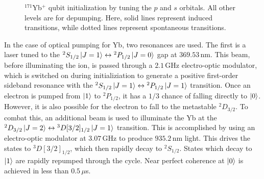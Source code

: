 \documentclass[12pt,a4paper]{amsart}
\numberwithin{equation}{section}
\theoremstyle{plain}
\theoremstyle{definition}
\begin{document}
\begin{figure}
{}
    \caption{${}^{171}$Yb$^+$ qubit initialization by tuning the $p$ and $s$ orbitals. All other levels are for depumping. Here, solid lines represent induced transitions, while dotted lines represent spontaneous transitions. \cite{rareEartQubi}}
    \label{fig:rareEartQubi3}
\end{figure}


In the case of optical pumping for Yb, two resonances are used.
The first is a laser tuned to the ${}^2S_{1/2}\ket{J=1} \leftrightarrow {}^2P_{1/2}\ket{J=0}$ gap at $369.53\,$nm. This beam, before illuminating the ion, is passed through a $2.1\,$GHz electro-optic modulator, which is switched on during initializiation to generate a positive first-order sideband resonance with the ${}^2S_{1/2}\ket{J=1}\leftrightarrow {}^2P_{1/2}\ket{J=1}$ transition. Once an electron is pumped from $\ket{1}$ to ${}^2P_{1/2}$, it has a $1/3$ chance of falling directly to $\ket{0}$. However, it is also possible for the electron to fall to the metastable ${}^2D_{3/2}$. To combat this, an additional beam is used to illuminate the Yb at the ${}^2D_{3/2}\ket{J=2}\leftrightarrow {}^3D[3/2]_{1/2}\ket{J=1}$ transition. This is accomplished by using an electro-optic modulator at $3.07\,$GHz to produce $935.2\,$nm light. This drives the states to ${}^3D[3/2]_{1/2}$, which then rapidly decay to ${}^2S_{1/2}$. States which decay to $\ket{1}$ are rapidly repumped through the cycle. Near perfect coherence at $\ket{0}$ is achieved in less than $0.5\,\mu$s.
\end{document}

